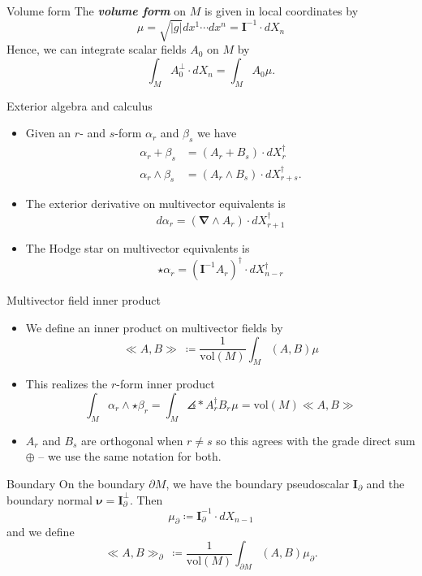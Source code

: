 \documentclass[aspectratio=169,handout]{beamer}
\newcommand\boldgreen[1]{\textcolor{lighter_csu_green}{\emph{\textbf{#1}}}}
\newcommand{\grad}{\boldsymbol{\nabla}}
\newcommand{\blade}[1]{\boldsymbol{#1}}
\newcommand{\multivecinnerproduct}[2]{\ll #1, #2\gg}
\newcommand{\boundary}{{\partial M}}
\newcommand{\pseudoscalar}{\blade{I}}
\DeclarePairedDelimiter\angles{\langle}{\rangle}
\newcommand{\proj}[2]{\angles*{#2}_{#1}}
\begin{document}
\begin{frame}{Volume form}
\vfill
    The \boldgreen{volume form} on $M$ is given in local coordinates by 
    \[
    \mu = \sqrt{|g|}dx^1\cdots dx^n = \pseudoscalar^{-1} \cdot dX_n
    \]
    Hence, we can integrate scalar fields $A_0$ on $M$ by
    \[
    \int_M A_0^\perp \cdot dX_n =  \int_M A_0 \mu.
    \]
\vfill
\end{frame}

\begin{frame}{Exterior algebra and calculus}
\vfill
\begin{itemize}
\item Given an $r$- and $s$-form $\alpha_r$ and $\beta_s$ we have
\begin{align*}
\alpha_r + \beta_s &= (A_r+B_s) \cdot dX_r^\dagger\\
\alpha_r \wedge \beta_s &= (A_r \wedge B_s) \cdot dX_{r+s}^\dagger.
\end{align*}

\item The exterior derivative on multivector equivalents is 
\[
d\alpha_r = (\grad \wedge A_r) \cdot dX_{r+1}^\dagger
\]

\item The Hodge star on multivector equivalents is
\[
\star \alpha_r = (\pseudoscalar^{-1} A_r)^\dagger \cdot dX_{n-r}^\dagger
\]
\end{itemize}
\vfill
\end{frame}

\begin{frame}{Multivector field inner product}
\vfill
\begin{itemize}
\item We define an inner product on multivector fields by 
\[
\multivecinnerproduct{A}{B}~ \coloneqq \frac{1}{\textrm{vol}(M)} \int_M (A,B)\mu
\]
\item This realizes the $r$-form inner product
\[
\int_M \alpha_r \wedge \star \beta_r = \int_M \proj{}{A_r^\dagger B_r}\mu = \textrm{vol}(M)\multivecinnerproduct{A}{B}
\]
\item $A_r$ and $B_s$ are orthogonal when $r\neq s$ so this agrees with the grade direct sum $\oplus$ -- we use the same notation for both.
\end{itemize}
\vfill
\end{frame}

\begin{frame}{Boundary}
\vfill
On the boundary $\partial M$, we have the boundary pseudoscalar $\pseudoscalar_{\partial}$ and the boundary normal $\blade{\nu} = \pseudoscalar_\partial^\perp$. Then
\[
\mu_\partial \coloneqq \pseudoscalar_\partial^{-1} \cdot dX_{n-1}
\] 
and we define 
\[
\multivecinnerproduct{A}{B}_\partial~ \coloneqq \frac{1}{\textrm{vol}(M)}\int_{\boundary} (A,B)\mu_\partial.
\]
\vfill
\end{frame}
\end{document}
